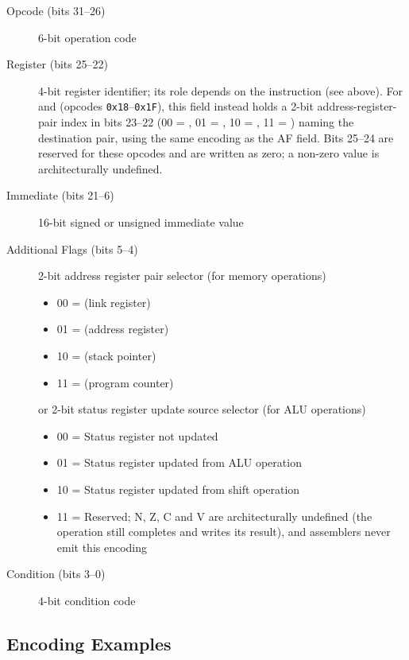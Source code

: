 \begin{description}
	\item[Opcode (bits 31--26)] 6-bit operation code
	\item[Register (bits 25--22)] 4-bit register identifier; its role depends on the instruction (see above). For 
	      and  (opcodes \texttt{0x18}--\texttt{0x1F}), this field instead holds a 2-bit address-register-pair
	      index in bits 23--22 (00 = , 01 = , 10 = , 11 = ) naming the destination pair, using the
	      same encoding as the AF field. Bits 25--24 are reserved for these opcodes and are written as zero; a non-zero value is
	      architecturally undefined.
	\item[Immediate (bits 21--6)] 16-bit signed or unsigned immediate value
	\item[Additional Flags (bits 5--4)] 2-bit address register pair selector (for memory operations)
	      \begin{itemize}
		      \item 00 =  (link register)
		      \item 01 =  (address register)
		      \item 10 =  (stack pointer)
		      \item 11 =  (program counter)
	      \end{itemize}
	      or 2-bit status register update source selector (for ALU operations)
	      \begin{itemize}
		      \item 00 = Status register not updated
		      \item 01 = Status register updated from ALU operation
		      \item 10 = Status register updated from shift operation
		      \item 11 = Reserved; N, Z, C and V are architecturally undefined (the operation still completes and writes its result), and assemblers never emit this encoding
	      \end{itemize}
	\item[Condition (bits 3--0)] 4-bit condition code
\end{description}

\subsection{Encoding Examples}



